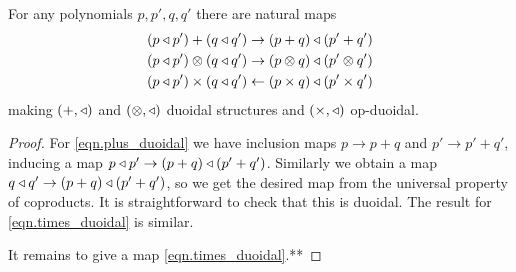 \documentclass[Book-Poly]{subfiles}
\begin{document}


\begin{proposition}
For any polynomials $p,p',q,q'$ there are natural maps
\begin{align}\label{eqn.plus_duoidal}
	(p\mathbin{\triangleleft} p')+(q\mathbin{\triangleleft} q')&\to (p+q)\mathbin{\triangleleft}(p'+q')\\\label{eqn.otimes_duoidal}
	(p\mathbin{\triangleleft} p')\otimes(q\mathbin{\triangleleft} q')&\to(p\otimes q)\mathbin{\triangleleft}(p'\otimes q')\\\label{eqn.times_duoidal}
	(p\mathbin{\triangleleft} p')\times (q\mathbin{\triangleleft} q')&\leftarrow(p\times q)\mathbin{\triangleleft}(p'\times q')
\end{align}
making $(+,\mathbin{\triangleleft})$ and $(\otimes,\mathbin{\triangleleft})$ duoidal structures and $(\times,\mathbin{\triangleleft})$ op-duoidal.
\end{proposition}
\begin{proof}
For \eqref{eqn.plus_duoidal} we have inclusion maps $p\to p+q$ and $p'\to p'+q'$, inducing a map $p\mathbin{\triangleleft} p'\to(p+q)\mathbin{\triangleleft}(p'+q')$. Similarly we obtain a map $q\mathbin{\triangleleft} q'\to(p+q)\mathbin{\triangleleft}(p'+q')$, so we get the desired map from the universal property of coproducts. It is straightforward to check that this is duoidal. The result for \eqref{eqn.times_duoidal} is similar. 

It remains to give a map \eqref{eqn.times_duoidal}.**
\end{proof}

\end{document}
